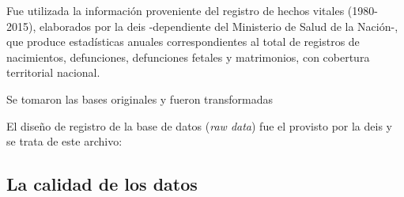 \documentclass[12pt,spanish,]{article}
\begin{document}
Fue utilizada la información proveniente del registro de hechos vitales
(1980-2015), elaborados por la \gls{deis} -dependiente del Ministerio de
Salud de la Nación-, que produce estadísticas anuales correspondientes
al total de registros de nacimientos, defunciones, defunciones fetales y
matrimonios, con cobertura territorial nacional.

Se tomaron las bases originales y fueron transformadas

El diseño de registro de la base de datos (\emph{raw data}) fue el
provisto por la \gls{deis} y se trata de este archivo:

\hypertarget{la-calidad-de-los-datos}{%
\subsection{La calidad de los datos}\label{la-calidad-de-los-datos}}
\end{document}
